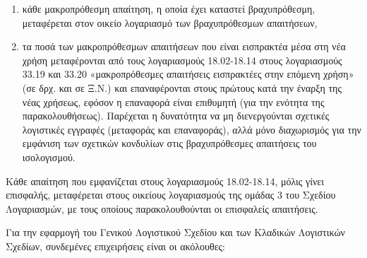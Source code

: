 \documentclass[A4,10pt,greek]{book}
\begin{document}
\begin{enumerate}

\item κάθε μακροπρόθεσμη απαίτηση, η οποία έχει καταστεί βραχυπρόθεσμη, μεταφέρεται στον οικείο λογαριασμό των βραχυπρόθεσμων απαιτήσεων, 

\item τα ποσά των μακροπρόθεσμων απαιτήσεων που είναι εισπρακτέα μέσα στη νέα χρήση μεταφέρονται από τους λογαριασμούς 18.02-18.14 στους λογαριασμούς 33.19 και 33.20 «μακροπρόθεσμες απαιτήσεις εισπρακτέες στην επόμενη χρήση» (σε δρχ. και σε Ξ.Ν.) και επαναφέρονται στους πρώτους κατά την έναρξη της νέας χρήσεως, εφόσον η επαναφορά είναι επιθυμητή (για την ενότητα της παρακολουθήσεως). Παρέχεται η δυνατότητα να μη διενεργούνται σχετικές λογιστικές εγγραφές (μεταφοράς και επαναφοράς), αλλά μόνο διαχωρισμός για την εμφάνιση των σχετικών κονδυλίων στις βραχυπρόθεσμες απαιτήσεις του ισολογισμού.

\end{enumerate}

Κάθε απαίτηση που εμφανίζεται στους λογαριασμούς 18.02-18.14, μόλις γίνει επισφαλής, μεταφέρεται στους οικείους λογαριασμούς της ομάδας 3 του Σχεδίου Λογαριασμών, με τους οποίους παρακολουθούνται οι επισφαλείς απαιτήσεις.

Για την εφαρμογή του Γενικού Λογιστικού Σχεδίου και των Κλαδικών Λογιστικών Σχεδίων, συνδεμένες επιχειρήσεις είναι οι ακόλουθες:
\end{document}
